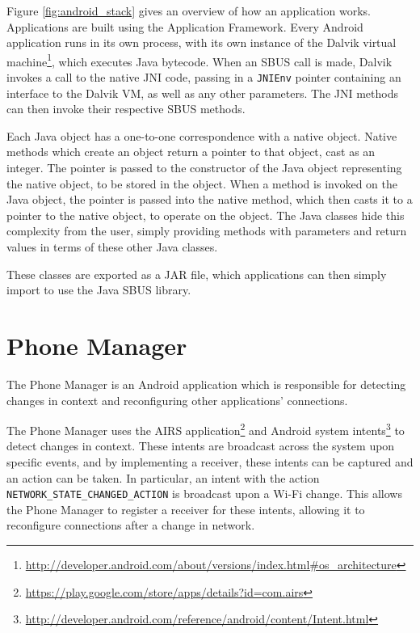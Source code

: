 \documentclass[12pt,twoside,notitlepage]{report}
\begin{document}
Figure \ref{fig:android_stack} gives an overview of how an application works. 
Applications are built using the Application Framework. 
Every Android application runs in its own process, with its own instance of the Dalvik virtual machine\footnote{\url{http://developer.android.com/about/versions/index.html\#os_architecture}}, which executes Java bytecode. 
When an SBUS call is made, Dalvik invokes a call to the native JNI code, passing in a {\tt JNIEnv} pointer containing an interface to the Dalvik VM, as well as any other parameters. 
The JNI methods can then invoke their respective SBUS methods. 

Each Java object has a one-to-one correspondence with a native object. 
Native methods which create an object return a pointer to that object, cast as an integer. 
The pointer is passed to the constructor of the Java object representing the native object, to be stored in the object. 
When a method is invoked on the Java object, the pointer is passed into the native method, which then casts it to a pointer to the native object, to operate on the object. 
The Java classes hide this complexity from the user, simply providing methods with parameters and return values in terms of these other Java classes.

These classes are exported as a JAR file, which applications can then simply import to use the Java SBUS library.

\section{Phone Manager}

The Phone Manager is an Android application which is responsible for detecting changes in context and reconfiguring other applications' connections. 

The Phone Manager uses the AIRS application\footnote{\url{https://play.google.com/store/apps/details?id=com.airs}} and Android system intents\footnote{\url{http://developer.android.com/reference/android/content/Intent.html}} to detect changes in context. 
These intents are broadcast across the system upon specific events, and by implementing a receiver, these intents can be captured and an action can be taken. 
In particular, an intent with the action {\tt NETWORK\_STATE\_CHANGED\_ACTION} is broadcast upon a Wi-Fi change.
This allows the Phone Manager to register a receiver for these intents, allowing it to reconfigure connections after a change in network. 
\end{document}
